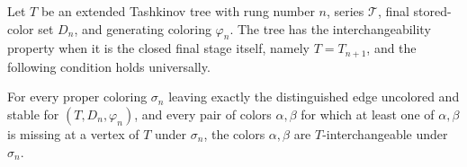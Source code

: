 \begin{definition}
Let \(T\) be an extended Tashkinov tree with rung number \(n\), series
\(\mathcal T\), final stored-color set \(D_n\), and generating coloring
\(\varphi_n\).  The tree has the interchangeability property when it is
the closed final stage itself, namely \(T=T_{n+1}\), and the following
condition holds universally.

For every proper coloring \(\sigma_n\) leaving exactly the distinguished
edge uncolored and stable for \((T,D_n,\varphi_n)\), and every pair of
colors \(\alpha,\beta\) for which at least one of \(\alpha,\beta\) is
missing at a vertex of \(T\) under \(\sigma_n\), the colors
\(\alpha,\beta\) are \(T\)-interchangeable under \(\sigma_n\).
\end{definition}

